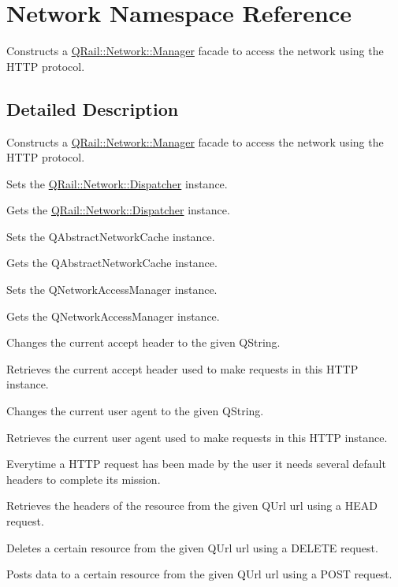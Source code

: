 \hypertarget{namespaceNetwork}{}\section{Network Namespace Reference}
\label{namespaceNetwork}


Constructs a \mbox{\hyperlink{classQRail_1_1Network_1_1Manager}{Q\+Rail\+::\+Network\+::\+Manager}} facade to access the network using the H\+T\+TP protocol.  




\subsection{Detailed Description}
Constructs a \mbox{\hyperlink{classQRail_1_1Network_1_1Manager}{Q\+Rail\+::\+Network\+::\+Manager}} facade to access the network using the H\+T\+TP protocol. 

Sets the \mbox{\hyperlink{classQRail_1_1Network_1_1Dispatcher}{Q\+Rail\+::\+Network\+::\+Dispatcher}} instance.

Gets the \mbox{\hyperlink{classQRail_1_1Network_1_1Dispatcher}{Q\+Rail\+::\+Network\+::\+Dispatcher}} instance.

Sets the Q\+Abstract\+Network\+Cache instance.

Gets the Q\+Abstract\+Network\+Cache instance.

Sets the Q\+Network\+Access\+Manager instance.

Gets the Q\+Network\+Access\+Manager instance.

Changes the current accept header to the given Q\+String.

Retrieves the current accept header used to make requests in this H\+T\+TP instance.

Changes the current user agent to the given Q\+String.

Retrieves the current user agent used to make requests in this H\+T\+TP instance.

Everytime a H\+T\+TP request has been made by the user it needs several default headers to complete it\textquotesingle{}s mission.

Retrieves the headers of the resource from the given Q\+Url url using a H\+E\+AD request.

Deletes a certain resource from the given Q\+Url url using a D\+E\+L\+E\+TE request.

Posts data to a certain resource from the given Q\+Url url using a P\+O\+ST request.

